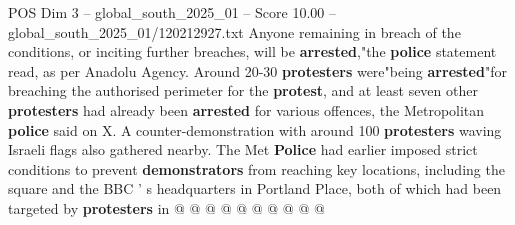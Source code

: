 \begin{textsample}{POS Dim 3 – global\_south\_2025\_01 – Score 10.00 – global\_south\_2025\_01/120212927.txt}
Anyone remaining in breach of the conditions, or inciting further breaches, will be \textbf{arrested},"the \textbf{police} statement read, as per Anadolu Agency.
Around 20-30 \textbf{protesters} were"being \textbf{arrested}"for breaching the authorised perimeter for the \textbf{protest}, and at least seven other \textbf{protesters} had already been \textbf{arrested} for various offences, the Metropolitan \textbf{police} said on X.
A counter-demonstration with around 100 \textbf{protesters} waving Israeli flags also gathered nearby.
The Met \textbf{Police} had earlier imposed strict conditions to prevent \textbf{demonstrators} from reaching key locations, including the square and the BBC ' s headquarters in Portland Place, both of which had been targeted by \textbf{protesters} in @ @ @ @ @ @ @ @ @ @

\end{textsample}
